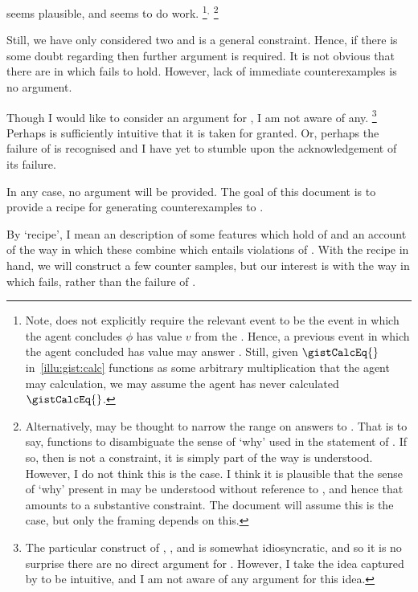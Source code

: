 \begin{note}
  \issueInclusion{} seems plausible, and seems to do work.%
  \footnote{
    Note, \qHow{} does not explicitly require the relevant event to be the event in which the agent concludes \(\phi\) has value \(v\) from the \pool{}.
    Hence, a previous event in which the agent concluded \propM{\gistCalcEq{}} has value  may answer \qHow{}.
    Still, given \(\gistCalcEq{}\) in~\autoref{illu:gist:calc} functions as some arbitrary multiplication that the agent may calculation, we may assume the agent has never calculated \(\gistCalcEq{}\).
  }\(^{,}\)%
  \footnote{
    Alternatively, \issueInclusion{} may be thought to narrow the range on answers to \qWhy{}.
    That is to say, \issueInclusion{} functions to disambiguate the sense of `why' used in the statement of \qWhy{}.
    If so, then \issueInclusion{} is not a constraint, it is simply part of the way \qWhy{} is understood.
    However, I do not think this is the case.
    I think it is plausible that the sense of `why' present in \qWhy{} may be understood without reference to \issueInclusion{}, and hence that \issueInclusion{} amounts to a substantive constraint.
    The document will assume this is the case, but only the framing depends on this.
  }

  Still, we have only considered two  and \issueInclusion{} is a general constraint.
  Hence, if there is some doubt regarding \issueInclusion{} then further argument is required.
  It is not obvious that there are  in which \issueInclusion{} fails to hold.
  However, lack of immediate counterexamples is no argument.

  Though I would like to consider an argument for \issueInclusion{}, I am not aware of any.%
  \footnote{
    The particular construct of \qWhy{}, \qHow{}, and \issueInclusion{} is somewhat idiosyncratic, and so it is no surprise there are no direct argument for \issueInclusion{}.
    However, I take the idea captured by \issueInclusion{} to be intuitive, and I am not aware of any argument for this idea.
  }
  Perhaps \issueInclusion{} is sufficiently intuitive that it is taken for granted.
  Or, perhaps the failure of \issueInclusion{} is recognised and I have yet to stumble upon the acknowledgement of its failure.

  In any case, no argument will be provided.
  The goal of this document is to provide a recipe for generating counterexamples to \issueInclusion{}.

  By `recipe', I mean an description of some features which hold of  and an account of the way in which these combine which entails violations of \issueInclusion{}.
  With the recipe in hand, we will construct a few counter samples, but our interest is with the way in which \issueInclusion{} fails, rather than the failure of \issueInclusion{}.


\end{note}
